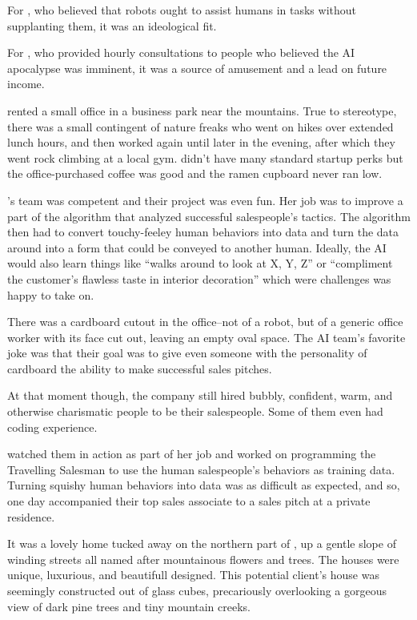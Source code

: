 For {\protag}, who believed that robots ought to assist humans in tasks without supplanting them, it was an ideological fit.

For {\sidetag}, who provided hourly consultations to people who believed the AI apocalypse was imminent, it was a source of amusement and a lead on future income.

\sectionBreak{}

\energyCompany{} rented a small office in a business park near the mountains. True to \crunchyCity{} stereotype, there was a small contingent of nature freaks who went on hikes over extended lunch hours, and then worked again until later in the evening, after which they went rock climbing at a local gym. \energyCompany{} didn't have many standard startup perks but the office-purchased coffee was good and the ramen cupboard never ran low.

{\protag}'s team was competent and their project was even fun. Her job was to improve a part of the algorithm that analyzed successful salespeople's tactics. The algorithm then had to convert touchy-feeley human behaviors into data and turn the data around into a form that could be conveyed to another human. Ideally, the AI would also learn things like ``walks around to look at X, Y, Z'' or ``compliment the customer's flawless taste in interior decoration'' which were challenges {\protag} was happy to take on.

There was a cardboard cutout in the office--not of a robot, but of a generic office worker with its face cut out, leaving an empty oval space. The AI team's favorite joke was that their goal was to give even someone with the personality of cardboard the ability to make successful sales pitches.

At that moment though, the company still hired bubbly, confident, warm, and otherwise charismatic people to be their salespeople. Some of them even had coding experience.

{\protag} watched them in action as part of her job and worked on programming the Travelling Salesman to use the human salespeople’s behaviors as training data. Turning squishy human behaviors into data was as difficult as expected, and so, one day {\protag} accompanied their top sales associate to a sales pitch at a private residence.

It was a lovely home tucked away on the northern part of \crunchyCity{}, up a gentle slope of winding streets all named after mountainous flowers and trees. The houses were unique, luxurious, and beautifull designed. This potential client's house was seemingly constructed out of glass cubes, precariously overlooking a gorgeous view of dark pine trees and tiny mountain creeks.

